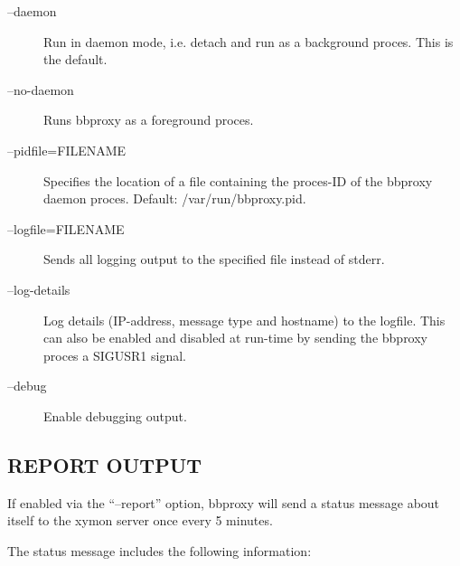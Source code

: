 \begin{description}
 

\item[--daemon] Run in daemon mode, i.e. detach and run as a background proces. This is the default. 

 

\item[--no-daemon] Runs bbproxy as a foreground proces. 

 

\item[--pidfile=FILENAME] Specifies the location of a file containing the proces-ID of the bbproxy daemon proces. Default: /var/run/bbproxy.pid. 

 

\item[--logfile=FILENAME] Sends all logging output to the specified file instead of stderr. 

 

\item[--log-details] Log details (IP-address, message type and hostname) to the logfile. This can also be enabled and disabled at run-time by sending the bbproxy proces a SIGUSR1 signal. 

 

\item[--debug] Enable debugging output. 

 


\end{description}
\subsection{REPORT OUTPUT}
 If enabled via the ``--report'' option, bbproxy will send a status message about itself to the xymon server once every 5 minutes. 

  The status message includes the following information: 


